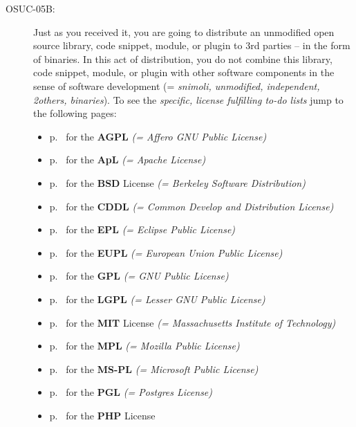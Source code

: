 \begin{description}
\item[OSUC-05B:]\label{OSUC-05B-DEF} Just as you received it, you are going to
distribute an unmodified open source library, code snippet, module, or plugin to
3rd parties -- in the form of binaries. In this act of distribution, you do not
combine this library, code snippet, module, or plugin with other software
components in the sense of software development (= \textit{snimoli, unmodified,
independent, 2others, binaries}). To see the \textit{specific, license
fulfilling to-do lists} jump to the following pages:
  \begin{itemize}
    \item p.\ \pageref{OSUC-05B-AGPL} for the \textbf{AGPL}
      \textit{(= Affero GNU Public License)} 
    \item p.\ \pageref{OSUC-05B-Apache20} for the \textbf{ApL}
      \textit{(= Apache License)}
    \item p.\ \pageref{OSUC-05B-BSD} for the \textbf{BSD} License
      \textit{(= Berkeley Software Distribution)}
    \item p.\ \pageref{OSUC-05B-CDDL} for the \textbf{CDDL}
      \textit{(= Common Develop and Distribution License)}  
    \item p.\ \pageref{OSUC-05B-EPL} for the \textbf{EPL}
      \textit{(= Eclipse Public License)}     
    \item p.\ \pageref{OSUC-05B-EUPL} for the \textbf{EUPL}
      \textit{(= European Union Public License)} 
    \item p.\ \pageref{OSUC-05B-GPL} for the \textbf{GPL}
       \textit{(= GNU Public License)} 
    \item p.\ \pageref{OSUC-05B-LGPL} for the \textbf{LGPL}
      \textit{(= Lesser GNU Public License)}           
    \item p.\ \pageref{OSUC-05B-MIT} for the \textbf{MIT} License
       \textit{(= Massachusetts Institute of Technology)} 
    \item p.\ \pageref{OSUC-05B-MPL} for the \textbf{MPL}
      \textit{(= Mozilla Public License)}     
    \item p.\ \pageref{OSUC-05B-MS-PL} for the \textbf{MS-PL}
      \textit{(= Microsoft Public License)} 
    \item p.\ \pageref{OSUC-05B-PGL} for the \textbf{PGL}
      \textit{(= Postgres License)} 
    \item p.\ \pageref{OSUC-05B-PHP} for the \textbf{PHP} License 
  \end{itemize}



\end{description}
